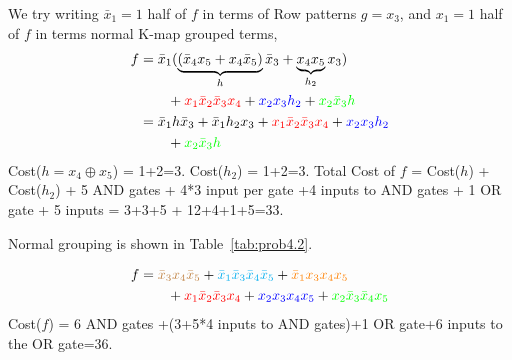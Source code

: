 \documentclass[twocolumn]{article}
\newcommand{\bx}{\bar{x}}
\begin{document}
We try writing $\bx_1 = 1$ half of $f$ in terms of Row patterns $g = x_3$, and $x_1 =
1$ half of $f$ in terms normal K-map grouped terms,
%
\begin{align}
  f &= \bx_1 ( \underbrace{(\bx_4 x_5 + x_4 \bx_5)}_{h} \bx_3 + \underbrace{x_4 x_5}_{h_2} x_3)
      \notag\\&\qquad
  + {\color{red} x_1 \bx_2\bx_3x_4} + {\color{blue} x_2x_3 h_2} + {\color{green} x_2\bx_3 h}
  \notag\\
    &=\bx_1 h \bx_3 + \bx_1 h_2 x_3 
      + {\color{red} x_1 \bx_2\bx_3x_4} + {\color{blue} x_2x_3 h_2} 
  \notag\\&\qquad
  + {\color{green} x_2\bx_3 h}
  \notag
\end{align}
%
Cost($h = x_4 \oplus x_5 $) = 1+2=3. Cost($h_2$) = 1+2=3. Total Cost of $f$ = Cost($h$) +
Cost($h_2$) + 5 AND gates + 4*3 input per gate +4 inputs to AND gates + 1 OR
gate + 5 inputs = 3+3+5 + 12+4+1+5=33.

Normal grouping is shown in Table~\ref{tab:prob4.2}.


% 
\begin{align}
  f &= {\color{brown} \bx_3 x_4\bx_5} + {\color{cyan} \bx_1 \bx_3 \bx_4 \bx_5}
      + {\color{orange} \bx_1 x_3 x_4 x_5 }
  \notag\\&\qquad
      + {\color{red} x_1 \bx_2\bx_3x_4}
      + {\color{blue} x_2x_3 x_4x_5}
      + {\color{green} x_2\bx_3 \bx_4 x_5}
\end{align}
% 
Cost($f$) = 6 AND gates +(3+5*4 inputs to AND gates)+1 OR gate+6 inputs to the
OR gate=36.

%
%
\end{document}
